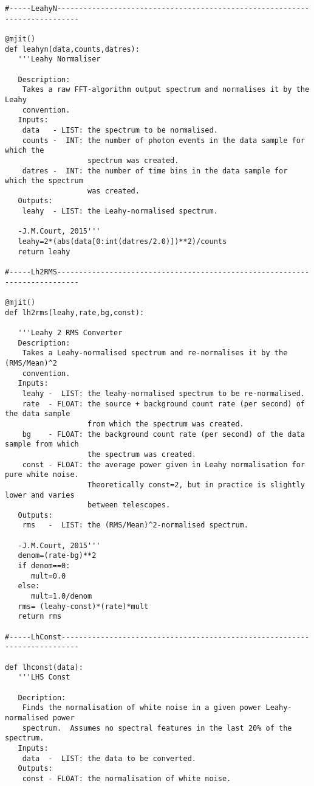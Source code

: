 \begin{verbatim}
#-----LeahyN---------------------------------------------------------------------------

@mjit()
def leahyn(data,counts,datres):
   '''Leahy Normaliser

   Description:
    Takes a raw FFT-algorithm output spectrum and normalises it by the Leahy
    convention.
   Inputs:
    data   - LIST: the spectrum to be normalised.
    counts -  INT: the number of photon events in the data sample for which the
                   spectrum was created.
    datres -  INT: the number of time bins in the data sample for which the spectrum
                   was created.
   Outputs:
    leahy  - LIST: the Leahy-normalised spectrum.

   -J.M.Court, 2015'''
   leahy=2*(abs(data[0:int(datres/2.0)])**2)/counts
   return leahy

#-----Lh2RMS---------------------------------------------------------------------------

@mjit()
def lh2rms(leahy,rate,bg,const):

   '''Leahy 2 RMS Converter
   Description:
    Takes a Leahy-normalised spectrum and re-normalises it by the (RMS/Mean)^2
    convention.
   Inputs:
    leahy -  LIST: the leahy-normalised spectrum to be re-normalised.
    rate  - FLOAT: the source + background count rate (per second) of the data sample
                   from which the spectrum was created.
    bg    - FLOAT: the background count rate (per second) of the data sample from which
                   the spectrum was created.
    const - FLOAT: the average power given in Leahy normalisation for pure white noise.
                   Theoretically const=2, but in practice is slightly lower and varies
                   between telescopes.
   Outputs:
    rms   -  LIST: the (RMS/Mean)^2-normalised spectrum.

   -J.M.Court, 2015'''
   denom=(rate-bg)**2
   if denom==0:
      mult=0.0
   else:
      mult=1.0/denom
   rms= (leahy-const)*(rate)*mult
   return rms

#-----LhConst--------------------------------------------------------------------------

def lhconst(data):
   '''LHS Const

   Decription:
    Finds the normalisation of white noise in a given power Leahy-normalised power
    spectrum.  Assumes no spectral features in the last 20% of the spectrum.
   Inputs:
    data  -  LIST: the data to be converted.
   Outputs:
    const - FLOAT: the normalisation of white noise.


\end{verbatim}
